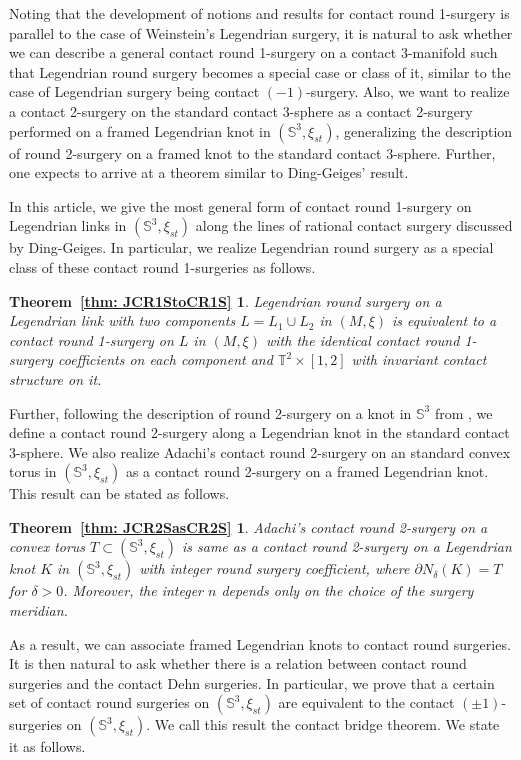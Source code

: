 \documentclass{amsart}
\theoremstyle{plain}
\newtheorem*{thmintro1}{Theorem~\ref{thm: JCR1StoCR1S}}
\newtheorem*{thmintro2}{Theorem~\ref{thm: JCR2SasCR2S}}
\theoremstyle{remark}
\theoremstyle{definition}
\newcommand{\s}{\mathbb{S}}
\newcommand{\dd}{\partial}
\begin{document}
Noting that the development of notions and results for contact round 1-surgery is parallel to the case of Weinstein's Legendrian surgery, it is natural to ask 
whether we can describe a general contact round 1-surgery on a contact 3-manifold such that Legendrian round surgery becomes a special case or class of it, similar to the case of Legendrian surgery being contact $(-1)$-surgery. 
Also, we want to realize a contact 2-surgery on the standard contact 3-sphere as a contact 2-surgery performed on a framed Legendrian knot in $\left(\s^3, \xi_{st}\right)$, 
generalizing the description of round 2-surgery on a framed knot to the standard contact 3-sphere.
Further, one expects to arrive at a theorem similar to Ding-Geiges' result.

In this article, we give the most general form of contact round 1-surgery on Legendrian links in $\left(\mathbb{S}^3, \xi_{st}\right)$ along the lines of rational contact surgery discussed by Ding-Geiges. 
In particular, we realize Legendrian round surgery as a special class of these contact round 1-surgeries as follows. 

\begin{thmintro1}
Legendrian round surgery on a Legendrian link with two components $L= L_1\cup L_2$ in $(M, \xi)$ is equivalent to a contact round 1-surgery on $L$ in $(M, \xi)$ with the identical contact round 1-surgery coefficients on each component and $\mathbb{T}^2 \times [1,2]$ with invariant contact structure on it.  
\end{thmintro1}

Further, following the description of round 2-surgery on a knot in $\s^3$ from \cite{PD-RSD}, we define a contact round 2-surgery along a Legendrian knot in the standard contact 3-sphere.
We also realize Adachi's contact round 2-surgery on an standard convex torus in $\left(\s^3, \xi_{st}\right)$ as a contact round 2-surgery on a framed Legendrian knot. This result can be stated as follows.  
\begin{thmintro2}
Adachi's contact round 2-surgery on a convex torus $T\subset (\mathbb{S}^3, \xi_{st})$ is same as a contact round 2-surgery on a Legendrian knot $K$ in $\left(\s^3, \xi_{st}\right)$ with integer round surgery coefficient, where $\dd N_{\delta}(K)= T$ for  $\delta>0$. 
Moreover, the integer $n$ depends only on the choice of the surgery meridian. 
\end{thmintro2}

As a result, we can associate framed Legendrian knots to contact round surgeries. 
It is then natural to ask whether there is a relation between contact round surgeries and the contact Dehn surgeries.
In particular, we prove that a certain set of contact round surgeries on $\left(\s^3, \xi_{st}\right)$ are equivalent to the contact $(\pm1)$-surgeries on $\left(\s^3, \xi_{st}\right)$. 
We call this result the contact bridge theorem. We state it as follows. 
\end{document}
